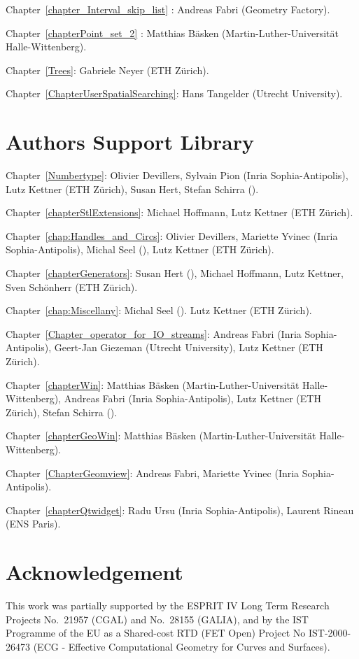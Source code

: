 \noindent
Chapter~\ref{chapter_Interval_skip_list} : Andreas Fabri ({\sc Geometry Factory}).

\noindent
Chapter~\ref{chapterPoint_set_2} : Matthias B\"asken (Martin-Luther-Universit{\"a}t Halle-Wittenberg).

\noindent
Chapter~\ref{Trees}: Gabriele Neyer (ETH Z\"urich).

\noindent
Chapter~\ref{ChapterUserSpatialSearching}: Hans Tangelder (Utrecht University).

\section*{Authors Support Library}

Chapter~\ref{Numbertype}: 
Olivier Devillers, Sylvain Pion ({\sc Inria} Sophia-Antipolis),
Lutz Kettner (ETH Z\"urich),
Susan Hert, Stefan Schirra ().

Chapter~\ref{chapterStlExtensions}: 
Michael Hoffmann, Lutz Kettner (ETH Z\"urich).

Chapter~\ref{chap:Handles_and_Circs}:
Olivier Devillers, Mariette Yvinec ({\sc Inria} Sophia-Antipolis),
Michal Seel (),
Lutz Kettner (ETH Z\"urich).

Chapter~\ref{chapterGenerators}: 
Susan Hert (),
Michael Hoffmann, Lutz Kettner, Sven Sch\"onherr (ETH Z\"urich).

Chapter~\ref{chap:Miscellany}:
Michal Seel ().
Lutz Kettner (ETH Z\"urich).

Chapter~\ref{Chapter_operator_for_IO_streams}: 
Andreas Fabri ({\sc Inria} Sophia-Antipolis),
Geert-Jan Giezeman (Utrecht University),
Lutz Kettner (ETH Z\"urich).

Chapter~\ref{chapterWin}:
Matthias B\"asken (Martin-Luther-Universit{\"a}t Halle-Wittenberg),
Andreas Fabri ({\sc Inria} Sophia-Antipolis),
Lutz Kettner (ETH Z\"urich),
Stefan Schirra ().

Chapter~\ref{chapterGeoWin}:
Matthias B\"asken (Martin-Luther-Universit{\"a}t Halle-Wittenberg).

Chapter~\ref{ChapterGeomview}:
Andreas Fabri, Mariette Yvinec ({\sc Inria} Sophia-Antipolis).

Chapter~\ref{chapterQtwidget}:
Radu Ursu ({\sc Inria} Sophia-Antipolis),
Laurent Rineau (ENS Paris).



\section*{Acknowledgement}


This work was partially supported by the ESPRIT IV Long Term Research
Projects No.~21957 (CGAL) and No.~28155 (GALIA), and by the IST
Programme of the EU as a Shared-cost RTD (FET Open) Project No
IST-2000-26473 (ECG - Effective Computational Geometry for Curves and
Surfaces).


